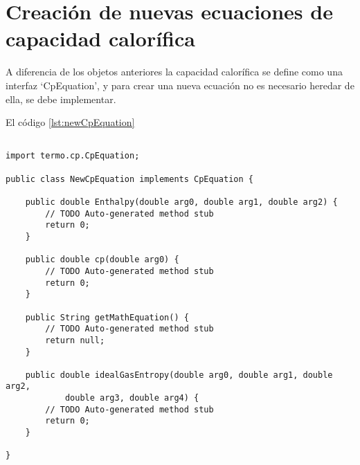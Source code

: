 \section{Creación de nuevas ecuaciones de capacidad calorífica}\label{sec:newCpEquation}

	A diferencia de los objetos anteriores la capacidad calorífica se define como una interfaz `CpEquation', y para crear una nueva ecuación no es necesario heredar de ella, se debe implementar.


	El código \ref{lst:newCpEquation}

	\begin{lstlisting}[caption={Esqueleto para crear una nueva ecuación de capacidad calorífica}, label={lst:newCpEquation}]

import termo.cp.CpEquation;

public class NewCpEquation implements CpEquation {

	public double Enthalpy(double arg0, double arg1, double arg2) {
		// TODO Auto-generated method stub
		return 0;
	}

	public double cp(double arg0) {
		// TODO Auto-generated method stub
		return 0;
	}

	public String getMathEquation() {
		// TODO Auto-generated method stub
		return null;
	}

	public double idealGasEntropy(double arg0, double arg1, double arg2,
			double arg3, double arg4) {
		// TODO Auto-generated method stub
		return 0;
	}

}
	\end{lstlisting}

